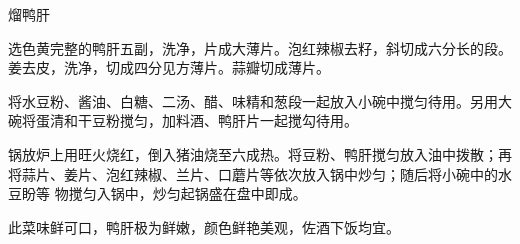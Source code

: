 \begin{recipe}{熘鸭肝}

\ingredients


\preparation

\step 选色黄完整的鸭肝五副，洗净，片成大薄片。泡红辣椒去籽，斜切成六分长的段。
姜去皮，洗净，切成四分见方薄片。蒜瓣切成薄片。

\step 将水豆粉、酱油、白糖、二汤、醋、味精和葱段一起放入小碗中搅匀待用。另用大
碗将蛋清和干豆粉搅匀，加料酒、鸭肝片一起搅勾待用。

\step 锅放炉上用旺火烧红，倒入猪油烧至六成热。将豆粉、鸭肝搅匀放入油中拨散；再
将蒜片、姜片、泡红辣椒、兰片、口蘑片等依次放入锅中炒匀；随后将小碗中的水豆盼等
物搅匀入锅中，炒匀起锅盛在盘中即成。

\features

此菜味鲜可口，鸭肝极为鲜嫩，颜色鲜艳美观，佐酒下饭均宜。

\end{recipe}

